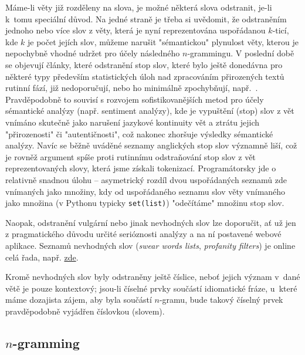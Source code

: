 Máme-li věty již rozděleny na slova, je možné některá slova odstranit,
je-li k~tomu speciální důvod. Na jedné straně je třeba si uvědomit,
že odstraněním jednoho nebo více slov z věty, která je nyní reprezentována
uspořádanou $k$-ticí, kde $k$ je počet jejích slov, můžeme narušit
"sémantickou" plynulost věty, kterou je nepochybně vhodné udržet pro účely
následného $n$-grammingu. V poslední době se objevují články, které
odstranění stop slov, které bylo ještě donedávna pro některé typy
především statistických úloh nad zpracováním přirozených textů rutinní
fází, již nedoporučují, nebo ho minimálně zpochybňují, např.~\cite{Saif2014}.
Pravděpodobně to souvisí s rozvojem sofistikovanějších metod pro účely
sémantické analýzy (např. sentiment analýzy), kde je vypuštění
(stop) slov z vět vnímáno skutečně jako narušení jazykové kontinuity
vět a ztrátu jejich "přirozenosti" či "autentičnosti", což nakonec
zhoršuje výsledky sémantické analýzy. Navíc se běžně uváděné seznamy
anglických stop slov významně liší, což je rovněž argument spíše proti
rutinnímu odstraňování stop slov z vět reprezentovaných slovy, která jsme
získali tokenizací. Programátorsky jde o relativně snadnou úlohu
-- asymetrický rozdíl dvou uspořádaných seznamů zde vnímaných jako množiny,
kdy od uspořádaného seznamu slov věty vnímaného jako množina
(v Pythonu typicky \texttt{set(list)}) "odečítáme" množinu stop slov.

Naopak, odstranění vulgární nebo jinak nevhodných slov%
 lze doporučit, ať
už jen z pragmatického důvodu určité serióznosti analýzy a na ní postavené
webové aplikace.
Seznamů nevhodných slov (\textit{swear words lists},
\textit{profanity filters}) je online celá řada, např.
\href{http://www.bannedwordlist.com/}{zde}.

Kromě nevhodných slov byly odstraněny ještě číslice, neboť jejich význam
v~dané větě je pouze kontextový; jsou-li číselné prvky součástí idiomatické
fráze, u~které máme dozajista zájem, aby byla součástí $n$-gramu, bude takový
číselný prvek pravděpodobně vyjádřen číslovkou (slovem).


\subsection{$n$-gramming}

